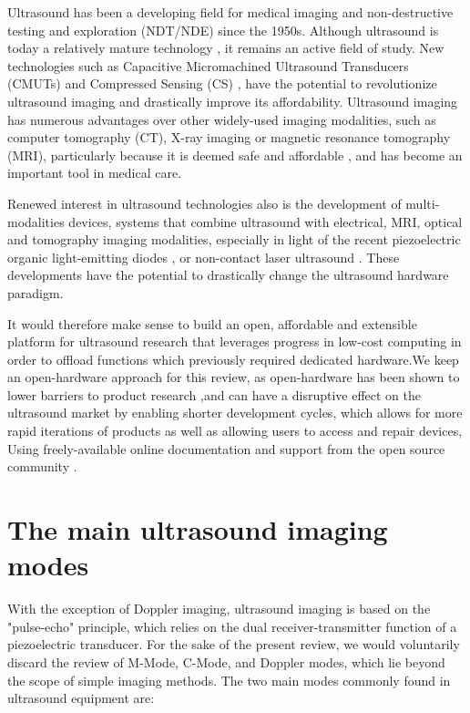 \documentclass{article}
\begin{document}
Ultrasound has been a developing field for medical imaging and non-destructive testing and exploration (NDT/NDE) since the 1950s. Although ultrasound is today a relatively mature technology \cite{kjeken_systematic_2011}, it remains an active field of study. 
New technologies such as Capacitive Micromachined Ultrasound Transducers (CMUTs) and Compressed Sensing (CS) \cite{kruizinga_compressive_2017, liebgott_compressive_2012}, have the potential to revolutionize ultrasound imaging and drastically improve its affordability. Ultrasound imaging has numerous advantages over other widely-used imaging modalities, such as computer tomography (CT), X-ray imaging or magnetic resonance tomography (MRI), particularly because it is deemed safe and affordable \cite{kurjak_use_1986}, and has become an important tool in medical care. 

Renewed interest in ultrasound technologies also is the development of multi-modalities devices, systems that combine ultrasound with electrical, MRI, optical and tomography imaging modalities, especially in light of the recent piezoelectric organic light-emitting diodes \cite{yu_direct_2020}, or non-contact laser ultrasound \cite{zhang_full_2019}. These developments have the potential to drastically change the ultrasound hardware paradigm.

It would therefore make sense to build an open, affordable and extensible platform for ultrasound research that leverages progress in low-cost computing in order to offload functions which previously required dedicated hardware.We keep an open-hardware approach for this review, as open-hardware has been shown to lower barriers to product research \cite{pandey_open_2019},and  can have a disruptive effect on the ultrasound market by enabling shorter development cycles, which allows for more rapid iterations of products \cite{pearce_quantifying_2015, pearce_return_2016, moritz_economic_2019, winter_open_2019} as well as allowing users to access and repair devices, Using freely-available online documentation and support from the open source community \cite{gibney_open-hardware_2016}.

\section{The main ultrasound imaging modes}


With the exception of Doppler imaging, ultrasound imaging is based on the "pulse-echo" principle, which relies on the dual receiver-transmitter function of a piezoelectric transducer. For the sake of the present review, we would voluntarily discard the review of M-Mode, C-Mode, and Doppler modes, which lie beyond the scope of simple imaging methods. The two main modes commonly found in ultrasound equipment are:
\end{document}
